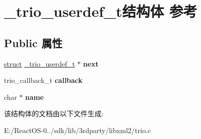 \hypertarget{struct__trio__userdef__t}{}\section{\+\_\+trio\+\_\+userdef\+\_\+t结构体 参考}
\label{struct__trio__userdef__t}
\subsection*{Public 属性}
\begin{DoxyCompactItemize}
\item 
\mbox{\label{struct__trio__userdef__t_ac32396a76d3d71b0d0beed1222f3f5fa}} 
\hyperlink{interfacestruct}{struct} \hyperlink{struct__trio__userdef__t}{\+\_\+trio\+\_\+userdef\+\_\+t} $\ast$ {\bfseries next}
\item 
\mbox{\label{struct__trio__userdef__t_a3fdd25583d89b3da8d20867c907eac1f}} 
trio\+\_\+callback\+\_\+t {\bfseries callback}
\item 
\mbox{\label{struct__trio__userdef__t_a94cd2b4264fa4a95bdf20aa4ec8a0934}} 
char $\ast$ {\bfseries name}
\end{DoxyCompactItemize}


该结构体的文档由以下文件生成\+:\begin{DoxyCompactItemize}
\item 
E\+:/\+React\+O\+S-\/0../sdk/lib/3rdparty/libxml2/trio.\+c\end{DoxyCompactItemize}
